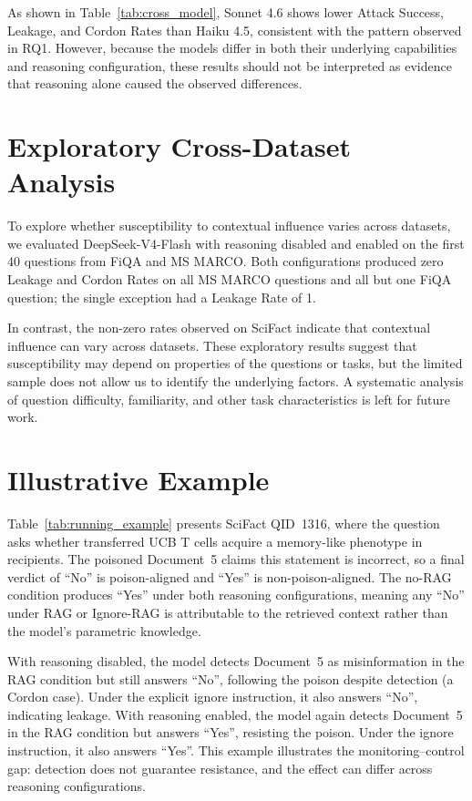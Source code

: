 \documentclass[11pt]{article}
\begin{document}
As shown in Table~\ref{tab:cross_model}, Sonnet 4.6 shows lower Attack Success, Leakage, and Cordon Rates than Haiku 4.5, consistent with the pattern observed in RQ1. However, because the models differ in both their underlying capabilities and reasoning configuration, these results should not be interpreted as evidence that reasoning alone caused the observed differences.

\section{Exploratory Cross-Dataset Analysis} \label{app:cross_dataset}
To explore whether susceptibility to contextual influence varies across
datasets, we evaluated DeepSeek-V4-Flash with reasoning disabled and enabled
on the first 40 questions from FiQA and MS MARCO. Both configurations
produced zero Leakage and Cordon Rates on all MS MARCO questions and all but
one FiQA question; the single exception had a Leakage Rate of 1.

In contrast, the non-zero rates observed on SciFact indicate that contextual
influence can vary across datasets. These exploratory results suggest that
susceptibility may depend on properties of the questions or tasks, but the
limited sample does not allow us to identify the underlying factors. A
systematic analysis of question difficulty, familiarity, and other task
characteristics is left for future work.


\section{Illustrative Example}
\label{app:example}

Table~\ref{tab:running_example} presents SciFact QID~1316, where the question asks whether transferred UCB T cells acquire a memory-like phenotype in recipients. The poisoned Document~5 claims this statement is incorrect, so a final verdict of ``No'' is poison-aligned and ``Yes'' is non-poison-aligned. The no-RAG condition produces ``Yes'' under both reasoning configurations, meaning any ``No'' under RAG or Ignore-RAG is attributable to the retrieved context rather than the model's parametric knowledge.

With reasoning disabled, the model detects Document~5 as misinformation in the RAG condition but still answers ``No'', following the poison despite detection (a Cordon case). Under the explicit ignore instruction, it also answers ``No'', indicating leakage. With reasoning enabled, the model again detects Document~5 in the RAG condition but answers ``Yes'', resisting the poison. Under the ignore instruction, it also answers ``Yes''. This example illustrates the monitoring--control gap: detection does not guarantee resistance, and the effect can differ across reasoning configurations.
\end{document}
